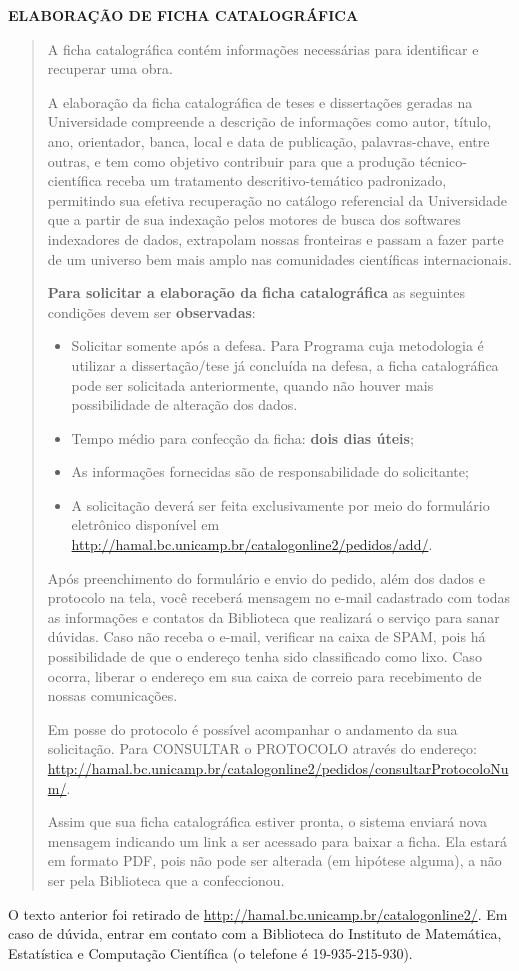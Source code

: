 \begin{center}
  {\Large\textbf{ELABORAÇÃO DE FICHA CATALOGRÁFICA}}
\end{center}

\begin{quotation}
  A ficha catalográfica contém informações necessárias para identificar e
  recuperar uma obra.

  A elaboração da ficha catalográfica de teses e dissertações geradas na
  Universidade compreende a descrição de informações como autor, título, ano,
  orientador, banca, local e data de publicação, palavras-chave, entre outras, e
  tem como objetivo contribuir para que a produção técnico-científica receba um
  tratamento descritivo-temático padronizado, permitindo sua efetiva recuperação
  no catálogo referencial da Universidade que a partir de sua indexação pelos
  motores de busca dos softwares indexadores de dados, extrapolam nossas
  fronteiras e passam a fazer parte de um universo bem mais amplo nas
  comunidades científicas internacionais.

  \textbf{Para solicitar a elaboração da ficha catalográfica} as seguintes condições
  devem ser \textbf{observadas}:

  \begin{itemize}
    \item Solicitar somente após a defesa. Para Programa cuja metodologia é
      utilizar a dissertação/tese já concluída na defesa, a ficha catalográfica
      pode ser solicitada anteriormente, quando não houver mais possibilidade de
      alteração dos dados.
    \item Tempo médio para confecção da ficha: \textbf{dois dias úteis};
    \item As informações fornecidas são de responsabilidade do solicitante;
    \item A solicitação deverá ser feita exclusivamente por meio do formulário
      eletrônico disponível em
      \url{http://hamal.bc.unicamp.br/catalogonline2/pedidos/add/}.
  \end{itemize}

    Após preenchimento do formulário e envio do pedido, além dos dados e
    protocolo na tela, você receberá mensagem no e-mail cadastrado com todas as
    informações e contatos da Biblioteca que realizará o serviço para sanar
    dúvidas. Caso não receba o e-mail, verificar na caixa de SPAM, pois há
    possibilidade de que o endereço tenha sido classificado como lixo. Caso
    ocorra, liberar o endereço em sua caixa de correio para recebimento de
    nossas comunicações.

    Em posse do protocolo é possível acompanhar o andamento da sua solicitação.
    Para CONSULTAR o PROTOCOLO através do endereço:
    \url{http://hamal.bc.unicamp.br/catalogonline2/pedidos/consultarProtocoloNum/}.

    Assim que sua ficha catalográfica estiver pronta, o sistema enviará
    nova mensagem indicando um link a ser acessado para baixar a ficha. Ela
    estará em formato PDF, pois não pode ser alterada (em hipótese alguma), a
    não ser pela Biblioteca que a confeccionou.
\end{quotation}

O texto anterior foi retirado de
\url{http://hamal.bc.unicamp.br/catalogonline2/}. Em caso de dúvida, entrar em
contato com a Biblioteca do Instituto de Matemática, Estatística e Computação
Científica (o telefone é 19-935-215-930).

\thispagestyle{plain}  %
